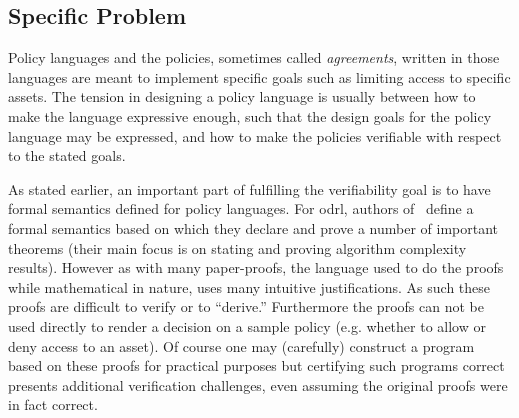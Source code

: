 \documentclass[runningheads,a4paper]{llncs}
\begin{document}
%
%
%
%


\subsection{Specific Problem}

Policy languages and the policies, sometimes called \emph{agreements}, written in those languages are meant to implement specific goals such as limiting access to specific assets. The tension in designing a policy language is usually between how to make the language expressive enough, such that the design goals for the policy language may be expressed, and how to make the policies verifiable with respect to the stated goals.

As stated earlier, an important part of fulfilling the verifiability goal is to have formal semantics defined for policy languages. For \ac{odrl}, authors of~\cite{pucella2006} define a formal semantics based on which they declare and prove a number of important theorems (their main focus is on stating and proving algorithm complexity results). However as with many paper-proofs, the language used to do the proofs while mathematical in nature, uses many intuitive justifications. As such these proofs are difficult to verify or to ``derive.'' Furthermore the proofs can not be used directly to render a decision on a sample policy (e.g. whether to allow or deny access to an asset). Of course one may (carefully) construct a program based on these proofs for practical purposes but certifying such programs correct presents additional verification challenges, even assuming the original proofs were in fact correct.
\end{document}
